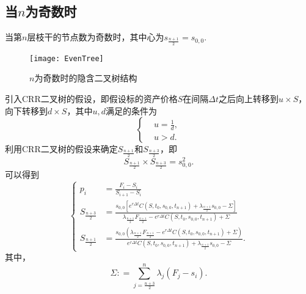 \subsection{当$n$为奇数时}
当第$n$层枝干的节点数为奇数时，其中心为$s_{\frac{n+1}{2}} = s_{0,0}.$
\begin{figure}[H]
	\centering
	\texttt{[image: EvenTree]}
	\caption{$n$为奇数时的隐含二叉树结构}
\end{figure}
引入CRR二叉树的假设，即假设标的资产价格$S$在间隔$\Delta t$之后向上转移到$u\times S$，向下转移到$d\times S$，其中$u,d$满足的条件为
\begin{equation*}
	\left\{
	\begin{aligned}
		& u = \frac{1}{d}, \nonumber\\
		& u > d. \nonumber
	\end{aligned}
	\right.
\end{equation*}
利用CRR二叉树的假设来确定$S_{\frac{n+1}{2}}$和$S_{\frac{n+3}{2}}$，即
$$S_{\frac{n+1}{2}} \times S_{\frac{n+3}{2}} = s_{0,0}^2.$$
可以得到
\begin{equation}
	\label{eq8}
	\left\{
	\begin{aligned}
		p_i &= \frac{F_i-S_i}{S_{i+1}-S_i } \\
		S_{\frac{n+3}{2}} & = \frac{s_{0,0}\left[e^{r\Delta t}C(S,t_0,s_{0,0},t_{n+1})+\lambda_{\frac{n+1}{2}} s_{0,0} - \Sigma\right]}{\lambda_{\frac{n+1}{2}}F_{\frac{n+1}{2}}-e^{r\Delta t}C(S,t_0,s_{0,0},t_{n+1})+\Sigma} \\
		S_{\frac{n+1}{2}} & = \frac{s_{0,0}\left(\lambda_{\frac{n+1}{2}} F_{\frac{n+1}{2}} - e^{r\Delta t}C(S,t_0,s_{0,0},t_{n+1}) + \Sigma \right)}{e^{r\Delta t}C(S,t_0,s_{0,0},t_{n+1})+\lambda_{\frac{n+1}{2}} s_{0,0}-\Sigma}.
	\end{aligned}
	\right.
\end{equation}
其中，
$$ \Sigma: = \sum_{j={\frac{n+3}{2}}}^n \lambda_j (F_j-s_i).$$
